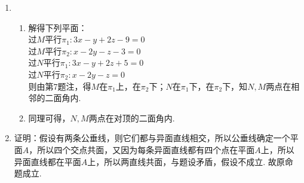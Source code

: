 \documentclass[UTF8]{ctexart}
\begin{document}
\begin{enumerate}
\item \begin{enumerate}[(1)]
\item 解得下列平面：\\过$M$平行$\pi_1:3x-y+2z-9=0$\\过$M$平行$\pi_2:x-2y-z-3=0$\\过$N$平行$\pi_1:3x-y+2z+5=0$\\过$N$平行$\pi_2:x-2y-z=0$\\
则由第7题注，得$M$在$\pi_1$上，在$\pi_2$下；$N$在$\pi_1$下，在$\pi_2$下，知$N,M$两点在相邻的二面角内. 
\item 同理可得，$N,M$两点在对顶的二面角内.
\end{enumerate}

\item 证明：假设有两条公垂线，则它们都与异面直线相交，所以公垂线确定一个平面$A$，所以四个交点共面，又因为每条异面直线都有四个点在平面$A$上，所以异面直线都在平面$A$上，所以两直线共面，与题设矛盾，假设不成立. 故原命题成立. 
\end{enumerate}

\subsection{}


\end{document}
